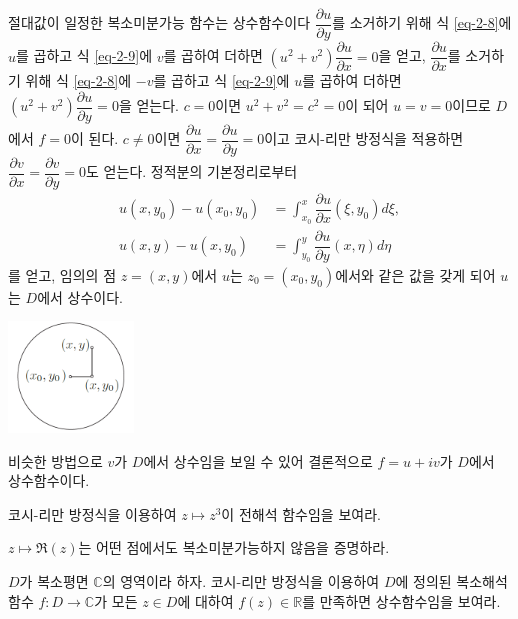 \begin{saltexample}[label=example-2-11]{절대값이 일정한 복소미분가능 함수는 상수함수이다}{}
$\dfrac{\partial u}{\partial y}$를 소거하기 위해 식 \eqref{eq-2-8}에 $u$를 곱하고
식 \eqref{eq-2-9}에 $v$를 곱하여 더하면
$(u^2+v^2)\dfrac{\partial u}{\partial x}  = 0$을 얻고,
$\dfrac{\partial u}{\partial x}$를 소거하기 위해 식 \eqref{eq-2-8}에 $-v$를 곱하고
식 \eqref{eq-2-9}에 $u$를 곱하여 더하면
$(u^2+v^2)\dfrac{\partial u}{\partial y}  = 0$을 얻는다.
$c=0$이면  $u^2+v^2=c^2=0$이 되어 $u=v=0$이므로 $D$에서 $f=0$이 된다.
$c\ne0$이면 $\dfrac{\partial u}{\partial x}= \dfrac{\partial u}{\partial y}=0$이고
코시-리만 방정식을 적용하면 
$\dfrac{\partial v}{\partial x}= \dfrac{\partial v}{\partial y}=0$도 얻는다.
정적분의 기본정리로부터 
\begin{align*}
u(x,y_0) - u(x_0, y_0) &= \int_{x_0}^x \dfrac{\partial u}{\partial x}(\xi, y_0)d\xi, \\
u(x,y) - u(x, y_0) &= \int_{y_0}^y \dfrac{\partial u}{\partial y}(x, \eta)d\eta
\end{align*}
를 얻고, 임의의 점 $z=(x,y)$에서 $u$는 $z_0 = (x_0,y_0)$에서와 같은 값을 갖게 되어
 $u$는 $D$에서 상수이다.

\begin{center}
\includegraphics[width=0.25\textwidth]{./SaltChapter/figs/fig-2-0-3}
\end{center}

비슷한 방법으로 $v$가 $D$에서 상수임을 보일 수 있어
결론적으로 $f=u+iv$가 $D$에서 상수함수이다.
\end{saltexample}

\begin{salt_exercise} \label{ex-2-10}
코시-리만 방정식을 이용하여 $z\mapsto z^3$이 전해석 함수임을 보여라.
\end{salt_exercise}

\begin{salt_exercise} \label{ex-2-11}
$z\mapsto \Re(z)$는 어떤 점에서도 복소미분가능하지 않음을 증명하라.
\end{salt_exercise}

\begin{salt_exercise} \label{ex-2-12}
$D$가 복소평면 $\mathbb C$의 영역이라 하자.
코시-리만 방정식을 이용하여 
$D$에 정의된 복소해석함수 $f:D\to\mathbb C$가 
모든  $z\in D$에 대하여 $f(z)\in\mathbb R$를 만족하면
상수함수임을 보여라.
\end{salt_exercise}

